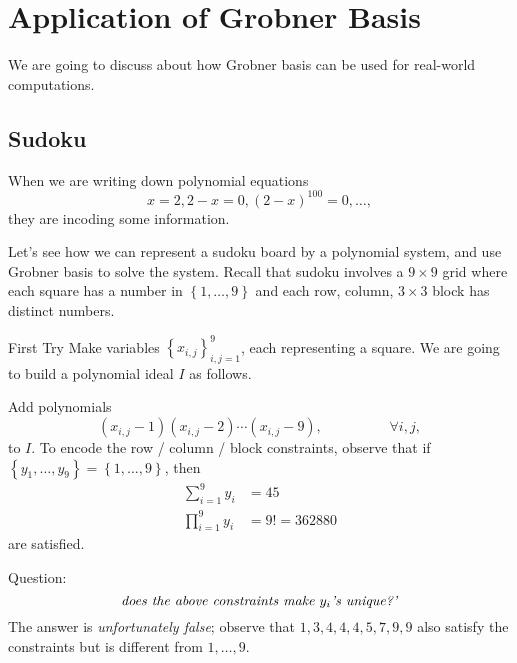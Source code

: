 \documentclass[co439]{subfiles}
\begin{document}
    \section{Application of Grobner Basis}
    
    We are going to discuss about how Grobner basis can be used for real-world computations.

    \subsection{Sudoku}

    When we are writing down polynomial equations
    \begin{equation*}
        x = 2, 2-x = 0 , \left( 2-x \right)^{100} = 0 , \ldots,
    \end{equation*}
    they are incoding some information.
    
    Let's see how we can represent a sudoku board by a polynomial system, and use Grobner basis to solve the system. Recall that sudoku involves a $9\times 9$ grid where each square has a number in $\left\lbrace 1,\ldots,9 \right\rbrace$ and each row, column, $3\times 3$ block has distinct numbers.

    \begin{boxy}{\itckabelstd First Try}
        Make variables $\left\lbrace x_{i,j} \right\rbrace^{9}_{i,j=1}$, each representing a square. We are going to build a polynomial ideal $I$ as follows.

        Add polynomials
        \begin{equation*}
            \left( x_{i,j}-1 \right)\left( x_{i,j}-2 \right)\cdots\left( x_{i,j}-9 \right) , \hspace{2cm}\forall i,j,
        \end{equation*}
        to $I$. To encode the row / column / block constraints, observe that if $\left\lbrace y_1,\ldots,y_9 \right\rbrace = \left\lbrace 1,\ldots,9 \right\rbrace$, then
        \begin{equation*}
            \begin{aligned}
                \sum^{9}_{i=1} y_i & = 45 \\
                \prod^{9}_{i=1} y_i & = 9! = 362880
            \end{aligned} 
        \end{equation*}
        are satisfied.

        Question:
        \begin{equation*}
            \text{\textit{does the above constraints make $y_i$'s unique?'}}
        \end{equation*}
        The answer is \textit{unfortunately false}; observe that $1,3,4,4,4,5,7,9,9$ also satisfy the constraints but is different from $1,\ldots,9$.
    \end{boxy}
\end{document}
